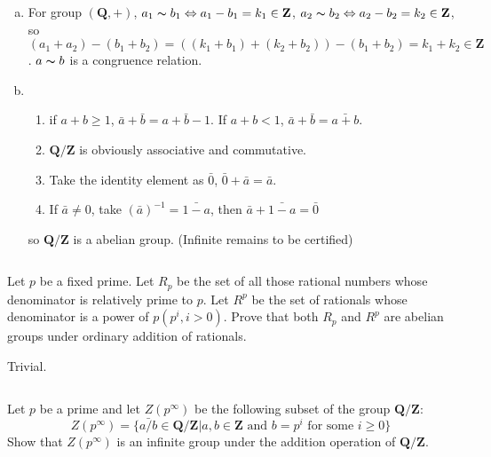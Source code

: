 \begin{answer}
    \begin{enumerate}[(a)]
        \item For group $(\mathbf{Q}, +)$, $a_1\thicksim b_1\Leftrightarrow a_1-b_1=k_1\in \mathbf{Z}$, $a_2\thicksim b_2\Leftrightarrow a_2-b_2=k_2\in \mathbf{Z}$, so $(a_1+a_2)-(b_1+b_2)=((k_1+b_1)+(k_2+b_2))-(b_1+b_2)=k_1+k_2\in\mathbf{Z}$. $a\thicksim b$ is a congruence relation.
        \item \begin{enumerate}[1]
            \item if $a+b\geq 1$, $\bar{a}+\bar{b}=\bar{a+b-1}$. If $a+b<1$, $\bar{a}+\bar{b}=\bar{a+b}$.
            \item $\mathbf{Q}/\mathbf{Z}$ is obviously associative and commutative.
            \item Take the identity element as $\bar{0}$, $\bar{0}+\bar{a}=\bar{a}$.
            \item If $\bar{a}\neq 0$, take $(\bar{a})^{-1}=\bar{1-a}$, then $\bar{a}+\bar{1-a}=\bar{0}$
        \end{enumerate}
        so $\mathbf{Q}/\mathbf{Z}$ is a abelian group. (Infinite remains to be certified)
    \end{enumerate}
\end{answer}

$$ $$

\begin{ex}
    Let $p$ be a fixed prime. Let $R_p$ be the set of all those rational numbers whose denominator is relatively prime to $p$. Let $R^p$ be the set of rationals whose denominator is a power of $p (p^i, i > 0)$. Prove that both $R_p$ and $R^p$ are abelian groups under ordinary addition of rationals.
\end{ex}

\begin{answer}
    Trivial.
\end{answer}

$$ $$

\begin{ex}
    Let $p$ be a prime and let $Z(p^\infty)$ be the following subset of the group $\mathbf{Q}/\mathbf{Z}$:\[Z(p^\infty)=\{\bar{a/b}\in\mathbf{Q}/\mathbf{Z}| a,b \in \mathbf{Z} \text{ and } b=p^i \text{ for some }i\geq 0\}\]
    Show that $Z(p^\infty)$ is an infinite group under the addition operation of $\mathbf{Q}/\mathbf{Z}$.
\end{ex}

